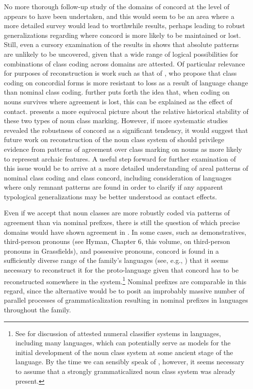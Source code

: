\documentclass[output=paper ,collection	  ,collectionchapter ,biblatexbackend=biber   ]{langscibook}
\begin{document}
No more thorough follow-up study of the domains of concord at the level of
 appears to have been undertaken, and this would seem to be
an area where a more detailed survey would lead to worthwhile results, perhaps
leading to robust generalizations regarding where concord is more likely to be
maintained or lost. Still, even a cursory examination of the results in
 shows that absolute patterns are unlikely to be
uncovered, given that a wide range of logical possibilities for combinations of
class coding across domains are attested. Of particular relevance for purposes
of reconstruction is work such as that of , who
propose that class coding on concordial forms is more resistant to loss as a
result of language change than nominal class coding.
 further puts forth the idea that, when coding
on nouns survives where agreement is lost, this can be explained as the effect
of contact.  presents a more equivocal picture about the
relative historical stability of these two types of noun class marking. However,
if more systematic studies revealed the robustness of concord as a significant
tendency, it would suggest that future work on reconstruction of the noun class
system of  should privilege evidence from patterns of
agreement over class marking on nouns as more likely to represent archaic
features. A useful step forward for further examination of this issue would be
to arrive at a more detailed understanding of areal patterns of nominal class
coding and class concord, including consideration of languages where only
remnant patterns are found in order to clarify if any apparent typological
generalizations may be better understood as contact effects.


\largerpage[-2]
Even if we accept that noun classes are more robustly coded via patterns of
agreement than via nominal prefixes, there is still the question of which
precise domains would have shown agreement in . In some cases,
such as demonstratives, third-person pronouns (see Hyman, Chapter 6, this volume, 
on third-person pronouns in Grassfields), and possessive pronouns, concord
is found in a sufficiently diverse range of the family's languages (see, e.g.,
) that it seems necessary to reconstruct it for the
proto-language given that concord has to be reconstructed somewhere in the
system.{\footnote{See  for discussion of attested
numeral classifier systems in  languages, including many 
languages, which can potentially serve as models for the initial
development of the  noun class system at some ancient stage of the
language. By the time we can sensibly speak of , however, it
seems necessary to assume that a strongly grammaticalized noun class system was
already present.}} Nominal prefixes are comparable in this regard, since the
alternative would be to posit an improbably massive number of parallel processes
of grammaticalization resulting in nominal prefixes in languages throughout the
family.
\end{document}
